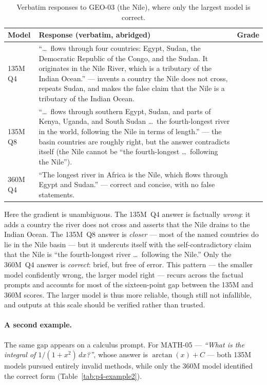 \begin{table}[H]
\centering
\caption{Verbatim responses to GEO-03 (the Nile), where only the largest model is correct.}
\label{tab:p4-example}
\renewcommand{\arraystretch}{1.3}
\begin{tabular}{@{}>{\raggedright\arraybackslash}p{} >{\raggedright\arraybackslash}p{} >{\centering\arraybackslash}p{}@{}}
\toprule
\textbf{Model} & \textbf{Response (verbatim, abridged)} & \textbf{Grade} \\
\midrule
135M Q4 &
``\dots\ flows through four countries: Egypt, Sudan, the Democratic Republic of the Congo, and the
Sudan. It originates in the Nile River, which is a tributary of the Indian Ocean.'' --- invents a
country the Nile does not cross, repeats Sudan, and makes the false claim that the Nile is a
tributary of the Indian Ocean.
& 0 \\
\midrule
135M Q8 &
``\dots\ flows through southern Egypt, Sudan, and parts of Kenya, Uganda, and South Sudan \dots\ the
fourth-longest river in the world, following the Nile in terms of length.'' --- the basin countries
are roughly right, but the answer contradicts itself (the Nile cannot be ``the fourth-longest \dots\
following the Nile'').
& 1 \\
\midrule
360M Q4 &
``The longest river in Africa is the Nile, which flows through Egypt and Sudan.'' --- correct and
concise, with no false statements.
& 2 \\
\bottomrule
\end{tabular}
\end{table}

Here the gradient is unambiguous. The 135M~Q4 answer is factually \emph{wrong}: it adds a country the
river does not cross and asserts that the Nile drains to the Indian Ocean. The 135M~Q8 answer is
\emph{closer} --- most of the named countries do lie in the Nile basin --- but it undercuts itself
with the self-contradictory claim that the Nile is ``the fourth-longest river \dots\ following the
Nile.'' Only the 360M~Q4 answer is \emph{correct}: brief, but free of error. This pattern --- the
smaller model confidently wrong, the larger model right --- recurs across the factual prompts and
accounts for most of the sixteen-point gap between the 135M and 360M scores. The larger model is thus
more reliable, though still not infallible, and outputs at this scale should be verified rather than
trusted.

\paragraph{A second example.} The same gap appears on a calculus prompt. For MATH-05 ---
\emph{``What is the integral of $1/(1+x^2)\,dx$?''}, whose answer is $\arctan(x)+C$ --- both 135M
models pursued entirely invalid methods, while only the 360M model identified the correct form
(Table~\ref{tab:p4-example2}).


